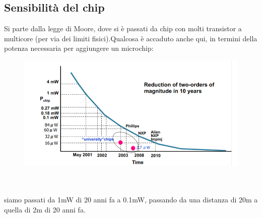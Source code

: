 \documentclass[oneside, 12pt]{extbook}
\begin{document}
\subsection{Sensibilità del chip}
Si parte dalla legge di Moore, dove si è passati da chip con molti transistor a multicore (per via dei limiti fisici).Qualcosa è accaduto anche qui, in termini della potenza necessaria per aggiungere un microchip:\\
\begin{figure}[!h]
	\includegraphics[scale=0.3]{immagini/pot_microchip.png}
\end{figure}
\\\\siamo passati da 1mW di 20 anni fa a 0.1mW, passando da una distanza di 20m a quella di 2m di 20 anni fa.
\end{document}
